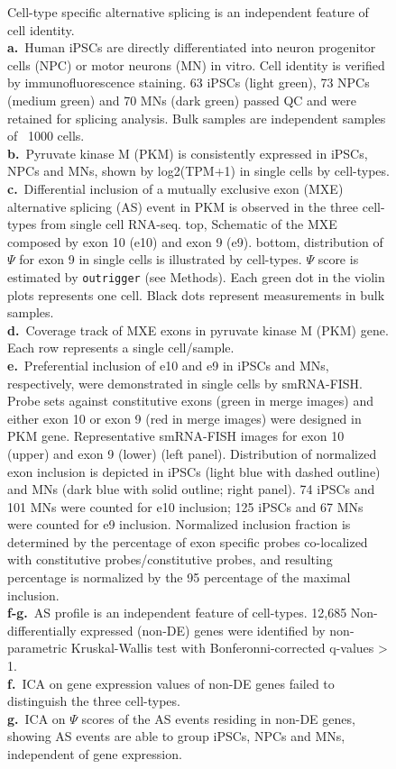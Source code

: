 \clearpage
\thispagestyle{facingcaption}
\begin{figure}[h]
\captionsetup{labelformat=prev-page}
\caption[Cell-type specific alternative splicing is an independent feature of cell identity.]{
Cell-type specific alternative splicing is an independent feature of cell identity.\\
\textbf{a.}~Human iPSCs are directly differentiated into neuron progenitor cells (NPC) or motor neurons (MN) in vitro. Cell identity is verified by immunofluorescence staining. 63 iPSCs (light green), 73 NPCs (medium green) and 70 MNs (dark green) passed QC and were retained for splicing analysis. Bulk samples are independent samples of ~1000 cells.\\
\textbf{b.}~Pyruvate kinase M (PKM) is consistently expressed in iPSCs, NPCs and MNs, shown by log2(TPM+1) in single cells by cell-types.\\
\textbf{c.}~Differential inclusion of a mutually exclusive exon (MXE) alternative splicing (AS) event in PKM is observed in the three cell-types from single cell RNA-seq. top, Schematic of the MXE composed by exon 10 (e10) and exon 9 (e9). bottom, distribution of $\Psi$ for exon 9 in single cells is illustrated by cell-types. $\Psi$ score is estimated by \texttt{outrigger} (see Methods). Each green dot in the violin plots represents one cell. Black dots represent measurements in bulk samples.\\
\textbf{d.}~Coverage track of MXE exons in pyruvate kinase M (PKM) gene. Each row represents a single cell/sample. \\
\textbf{e.}~Preferential inclusion of e10 and e9 in iPSCs and MNs, respectively, were demonstrated in single cells by smRNA-FISH. Probe sets against constitutive exons (green in merge images) and either exon 10 or exon 9 (red in merge images) were designed in PKM gene. Representative smRNA-FISH images for exon 10 (upper) and exon 9 (lower) (left panel). Distribution of normalized exon inclusion is depicted in iPSCs (light blue with dashed outline) and MNs (dark blue with solid outline; right panel). 74 iPSCs and 101 MNs were counted for e10 inclusion; 125 iPSCs and 67 MNs were counted for e9 inclusion. Normalized inclusion fraction is determined by the percentage of exon specific probes co-localized with constitutive probes/constitutive probes, and resulting percentage is normalized by the 95 percentage of the maximal inclusion.\\
\textbf{f-g.}~AS profile is an independent feature of cell-types. 12,685 Non-differentially expressed (non-DE) genes were identified by non-parametric Kruskal-Wallis test with Bonferonni-corrected q-values > 1. \\
\textbf{f.}~ICA on gene expression values of non-DE genes failed to distinguish the three cell-types. \\
\textbf{g.}~ICA on $\Psi$ scores of the AS events residing in non-DE genes, showing AS events are able to group iPSCs, NPCs and MNs, independent of gene expression.
}
\label{fig:system_overview}

\end{figure}
